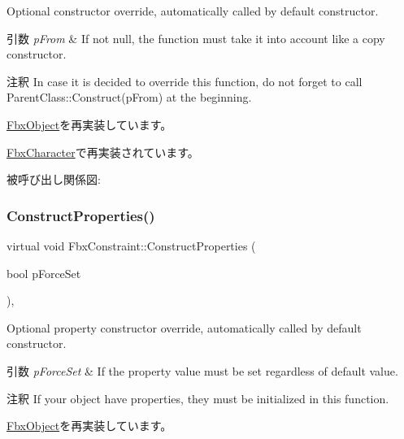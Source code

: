 Optional constructor override, automatically called by default constructor. 
\begin{DoxyParams}{引数}
{\em p\+From} & If not null, the function must take it into account like a copy constructor. \\
\hline
\end{DoxyParams}
\begin{DoxyRemark}{注釈}
In case it is decided to override this function, do not forget to call Parent\+Class\+::\+Construct(p\+From) at the beginning. 
\end{DoxyRemark}


\hyperlink{class_fbx_object_a313503bc645af3fdceb4a99ef5cea7eb}{Fbx\+Object}を再実装しています。



\hyperlink{class_fbx_character_afccb9b74c28560f04f05581a55c0b58a}{Fbx\+Character}で再実装されています。

被呼び出し関係図\+:
\mbox{\label{class_fbx_constraint_a0470a25b813b337d07a03ce4b97b44f8}} 
\subsubsection{\texorpdfstring{Construct\+Properties()}{ConstructProperties()}}
{\footnotesize\ttfamily virtual void Fbx\+Constraint\+::\+Construct\+Properties (\begin{DoxyParamCaption}\item[{bool}]{p\+Force\+Set }\end{DoxyParamCaption})\hspace{0.3cm}{\ttfamily [protected]}, {\ttfamily [virtual]}}

Optional property constructor override, automatically called by default constructor. 
\begin{DoxyParams}{引数}
{\em p\+Force\+Set} & If the property value must be set regardless of default value. \\
\hline
\end{DoxyParams}
\begin{DoxyRemark}{注釈}
If your object have properties, they must be initialized in this function. 
\end{DoxyRemark}


\hyperlink{class_fbx_object_ad44f814323dc1b5e78bff1bfc608b4bb}{Fbx\+Object}を再実装しています。




